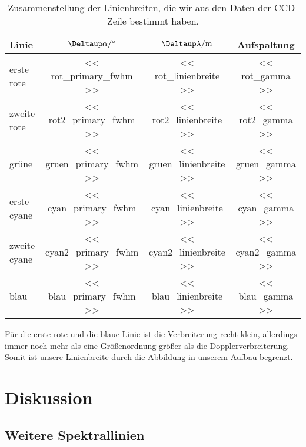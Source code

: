 \begin{landscape}

\begin{table}[htbp]
    \centering
    \begin{tabular}{lSSS}
        Linie & {$\Deltaup\alpha / \si\degree$} & {$\Deltaup\lambda /
    \si\meter$} & {Aufspaltung} \\
        \hline
        erste rote & << rot_primary_fwhm >> & << rot_linienbreite >> & <<
        rot_gamma >> \\
        zweite rote & << rot2_primary_fwhm >> & << rot2_linienbreite >> & <<
        rot2_gamma >> \\
        grüne & << gruen_primary_fwhm >> & << gruen_linienbreite >> & <<
        gruen_gamma >> \\
        erste cyane & << cyan_primary_fwhm >> & << cyan_linienbreite >> & <<
        cyan_gamma >> \\
        zweite cyane & << cyan2_primary_fwhm >> & << cyan2_linienbreite >> & <<
        cyan2_gamma >> \\
        blau & << blau_primary_fwhm >> & << blau_linienbreite >> & <<
        blau_gamma >> \\
    \end{tabular}
    \caption{%
        Zusammenstellung der Linienbreiten, die wir aus den Daten der CCD-Zeile
        bestimmt haben.
    }
    \label{tab:linienbreiten}
\end{table}

Für die erste rote und die blaue Linie ist die Verbreiterung recht klein,
allerdings immer noch mehr als eine Größenordnung größer als die
Dopplerverbreiterung. Somit ist unsere Linienbreite durch die Abbildung in
unserem Aufbau begrenzt.

\end{landscape}


\FloatBarrier
\section{Diskussion}

\subsection{Weitere Spektrallinien}

